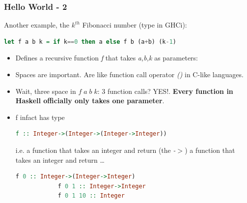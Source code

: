 		\begin{frame}[fragile]\frametitle{Hello World - 2}
		Another example, the $k^{th}$ Fibonacci number (type in GHCi):
		\begin{lstlisting}[language=Haskell,xleftmargin=-1.5em]
			let f a b k = if k==0 then a else f b (a+b) (k-1)
		\end{lstlisting}
		\begin{itemize}
		  \item	Defines a recursive function \emph{f} that takes \emph{a,b,k} as parameters:
		  \item Spaces are important. Are like function call operator
		  \emph{()} in C-like languages.
		  \item Wait, three space in $f\;a\;b\;k$: 3 function
		  calls? YES!. \textbf{Every function in Haskell officially only takes one
		  parameter}. 
		  \item f infact has type
		 \begin{lstlisting}[language=Haskell,xleftmargin=-1.5em]
			f :: Integer->(Integer->(Integer->Integer))
		\end{lstlisting}
		i.e. a function that takes an integer and return (the \emph{-$>$}) a function
		that takes an integer and return \ldots
		 \begin{lstlisting}[language=Haskell,xleftmargin=-1.5em]
			f 0 :: Integer->(Integer->Integer)
			f 0 1 :: Integer->Integer
			f 0 1 10 :: Integer
		\end{lstlisting}
		
		\end{itemize}
		
		\end{frame}
		
